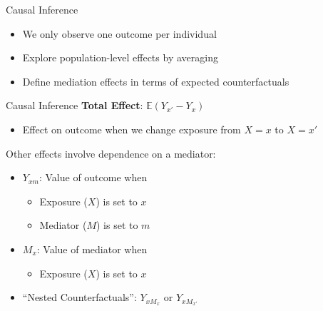 \documentclass[14pt]{beamer}
\begin{document}
\begin{frame}{Causal Inference}
    \begin{itemize}
        \item We only observe one outcome per individual\newline

        \item Explore population-level effects by averaging\newline

        \item Define mediation effects in terms of expected counterfactuals
    \end{itemize}
\end{frame}

\begin{frame}{Causal Inference}
    \textbf{Total Effect}: $\mathbb{E}(Y_{x'} - Y_{x})$
    \begin{itemize}
        \item Effect on outcome when we change exposure from $X=x$ to $X=x'$ \newline
    \end{itemize}

    Other effects involve dependence on a mediator:
    \begin{itemize}
        \item $Y_{xm}$: Value of outcome when
        \begin{itemize}
            \item Exposure ($X$) is set to $x$
            \item Mediator ($M$) is set to $m$
        \end{itemize}
        \item $M_x$: Value of mediator when
        \begin{itemize}
            \item Exposure ($X$) is set to $x$
        \end{itemize}
        \item ``Nested Counterfactuals'': $Y_{x M_x}$ or $Y_{x M_{x'}}$
    \end{itemize}

\end{frame}
\end{document}
